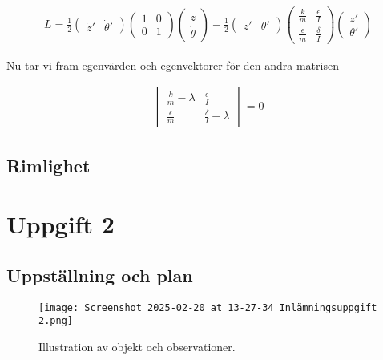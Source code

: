 \documentclass[a4paper]{article}
\begin{document}
\begin{align*}
    L = \frac{1}{2} \begin{pmatrix} \dot{z}' & \dot{\theta}' \end{pmatrix} \begin{pmatrix} 1 & 0 \\ 0 & 1 \end{pmatrix} \begin{pmatrix} \dot{z} \\ \dot{\theta} \end{pmatrix} - \frac{1}{2} \begin{pmatrix} z' & \theta' \end{pmatrix} \begin{pmatrix} \frac{k}{m} & \frac{\epsilon}{I} \\ \frac{\epsilon}{m} & \frac{\delta}{I} \end{pmatrix} \begin{pmatrix} z' \\ \theta' \end{pmatrix}
\end{align*}

Nu tar vi fram egenvärden och egenvektorer för den andra matrisen

\begin{align*}
    \begin{vmatrix}
        \frac{k}{m} - \lambda & \frac{\epsilon}{I} \\
        \frac{\epsilon}{m} & \frac{\delta}{I} - \lambda
    \end{vmatrix} = 0
\end{align*}

\subsection{Rimlighet}

\section{Uppgift 2}

\subsection{Uppställning och plan}
\begin{figure}[H]
    \begin{small}
        \begin{center}
            \texttt{[image: Screenshot 2025-02-20 at 13-27-34 Inlämningsuppgift 2.png]}
        \end{center}
        \caption{Illustration av objekt och observationer.}
        \label{fig:2}
    \end{small}
\end{figure}
\end{document}
